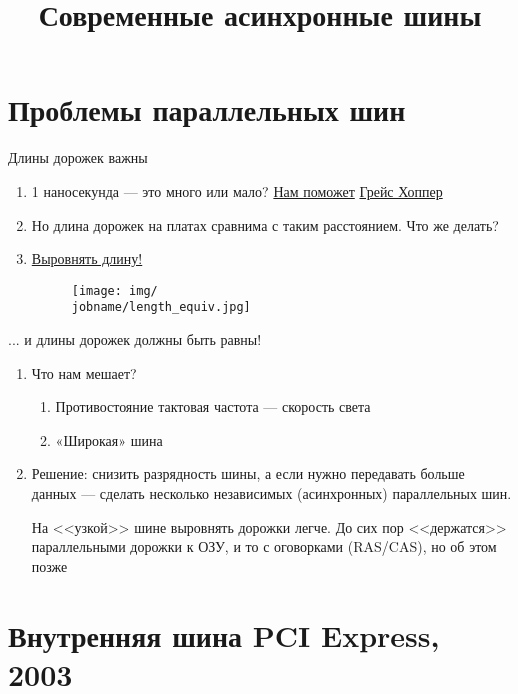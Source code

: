 \documentclass[xetex,aspectratio=43]{beamer}
\title[Современные асинхронные шины]{Современные асинхронные шины}
\begin{document}
\titleslide

\tocslide

\section{Проблемы параллельных шин}

\begin{frame}{Длины дорожек важны}
    \begin{enumerate}
        \item 1 наносекунда --- это много или мало? \href{https://youtu.be/gYqF6-h9Cvg}{Нам поможет} \href{https://en.wikipedia.org/wiki/Grace_Hopper}{Грейс Хоппер}
        \pause
        \item Но длина дорожек на платах сравнима с таким расстоянием. Что же делать?
        \pause
        \item \href{https://www.electromaker.io/blog/article/7-ways-to-quickly-judge-the-quality-of-your-printed-circuit-board-pcb-design}{Выровнять длину!}
        \begin{figure}
            \texttt{[image: img/\\jobname/length\_equiv.jpg]}
        \end{figure}
    \end{enumerate}
\end{frame}


\begin{frame}{... и длины дорожек должны быть равны!}
    \begin{enumerate}
        \item Что нам мешает?
        \begin{enumerate}
            \item Противостояние тактовая частота --- скорость света
            \item «Широкая» шина
        \end{enumerate}
        \pause
        \item \alert{Решение: снизить разрядность шины, а если нужно передавать больше данных --- сделать несколько независимых (асинхронных) параллельных шин.}

        На <<узкой>> шине выровнять дорожки легче. До сих пор <<держатся>> параллельными дорожки к ОЗУ, и то с оговорками (RAS/CAS), но об этом позже
    \end{enumerate}
\end{frame}

\section{Внутренняя шина PCI Express, 2003}
\end{document}

